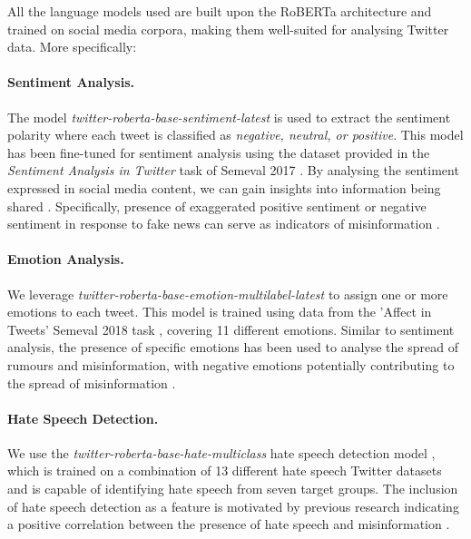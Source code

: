 All the language models used are built upon the RoBERTa architecture \cite{ROBERTA} and trained on social media corpora, making them well-suited for analysing Twitter data. More specifically:
    \paragraph{Sentiment Analysis.} The model \textit{twitter-roberta-base-sentiment-latest} \cite{loureiro-etal-2022-timelms} is used to extract the sentiment polarity where each tweet is classified as \textit{negative, neutral, or positive}. This model has been fine-tuned for sentiment analysis using the dataset provided in the \textit{Sentiment Analysis in Twitter} task of Semeval 2017 \cite{rosenthal2017semeval}.  By analysing the sentiment expressed in social media content, we can gain insights into information being shared  \cite{101007s42979021009189}. Specifically, presence of exaggerated positive sentiment or negative sentiment in response to fake news can serve as indicators of misinformation  \cite{electronics10111348}. 
    
    \paragraph{Emotion Analysis.} We leverage \textit{twitter-roberta-base-emotion-multilabel-latest} \cite{camacho2022tweetnlp} to assign one or more emotions to each tweet. This model is trained using data from the 'Affect in Tweets' Semeval 2018 task \cite{mohammad2018semeval}, covering 11 different emotions. Similar to sentiment analysis, the presence of specific emotions has been used to analyse the spread of rumours and misinformation, with negative emotions potentially contributing to the spread of misinformation \cite{vosoughi2018spread, weeks2015emotions}.
    
    
    \paragraph{Hate Speech Detection.} We use the \textit{twitter-roberta-base-hate-multiclass} hate speech detection model \cite{antypas2023robust}, which is trained on a combination of 13 different hate speech Twitter datasets and is capable of identifying hate speech from seven target groups. The inclusion of hate speech detection as a feature is motivated by previous research indicating a positive correlation between the presence of hate speech and misinformation \cite{10117720563051221150410}. 


